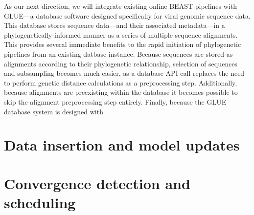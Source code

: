 As our next direction, we will integrate existing online BEAST pipelines with GLUE\cite{glue}---a database software designed specifically for viral genomic sequence data.
This database stores sequence data---and their associated metadata---in a phylogenetically-informed manner as a series of multiple sequence alignments.
This provides several immediate benefits to the rapid initiation of phylogenetic pipelines from an existing datbase instance.
Because sequences are stored as alignments according to their phylogenetic relationship, selection of sequences and subsampling becomes much easier, as a database API call replaces the need to perform genetic distance calculations as a preprocessing step.
Additionally, because alignments are preexisting within the database it becomes possible to skip the alignment preprocessing step entirely.
Finally, because the GLUE database system is designed with


\section{Data insertion and model updates}

\section{Convergence detection and scheduling}








\cleardoublepage

